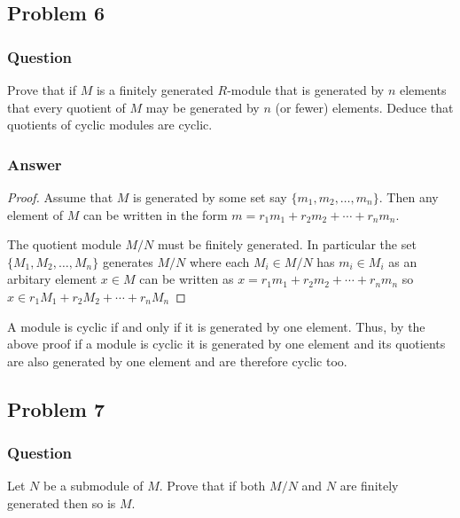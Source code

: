 \documentclass[12pt]{article}
\begin{document}
\subsection{Problem 6}
\subsubsection{Question}
Prove that if $M$ is a finitely generated $R$-module that is generated by $n$ elements that every quotient of $M$ may be generated by $n$ (or fewer) elements. Deduce that quotients of cyclic modules are cyclic.
\subsubsection{Answer}
\begin{proof}
Assume that $M$ is generated by some set say $\{m_1,m_2,\dots,m_n\}$. Then any element of $M$ can be written in the form $m = r_1m_1+r_2m_2+\cdots + r_nm_n$. 

The quotient module $M/N$ must be finitely generated. In particular the set $\{M_1,M_2,\dots,M_n\}$ generates $M/N$ where  each $M_i \in M/N$ has $m_i \in M_i$ as an arbitary element $x \in M$ can be written as $x = r_1m_1+r_2m_2+\cdots + r_nm_n$ so $ x \in  r_1M_1+r_2M_2+\cdots + r_nM_n$\end{proof}

A module is cyclic if and only if it is generated by one element. Thus, by the above proof if a module is cyclic it is generated by one element and its quotients are also generated by one element and are therefore cyclic too.



\subsection{Problem 7}
\subsubsection{Question}
Let $N$ be a submodule of $M$. Prove that if both $M/N$ and $N$ are finitely generated then so is $M$.
\end{document}
